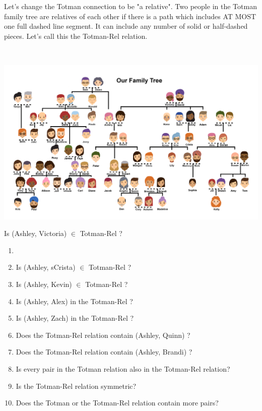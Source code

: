 \documentclass{ximera}
\begin{document}
                                                                                                            
Let's change the Totman connection to be "a relative". Two people in the Totman family tree are relatives of each other if there is a path which includes AT MOST one full dashed line segment. It can include any number of solid or half-dashed pieces. Let's call this the Totman-Rel relation.



\begin{exercise}
\quad \\
\begin{center}
\begin{image}
\includegraphics{Totman_Family_Tree.png}
\end{image}
\end{center}



\begin{problem} Is (Ashley, Victoria) $\in$ Totman-Rel ? 
\end{problem}



\begin{enumerate}
\item 






\item Is (Ashley, sCrista) $\in$ Totman-Rel ? 


\item Is (Ashley, Kevin) $\in$ Totman-Rel ?  
\item Is (Ashley, Alex) in the  Totman-Rel ?  
\item Is (Ashley, Zach) in the  Totman-Rel ?
\item Does the Totman-Rel relation contain (Ashley, Quinn) ?
\item Does the Totman-Rel relation contain (Ashley, Brandi) ?
\item Is every pair in the Totman relation also in the Totman-Rel relation?
\item Is the Totman-Rel relation symmetric?
\item Does the Totman or the Totman-Rel relation contain more pairs?
\end{enumerate}

\end{exercise}
\end{document}
